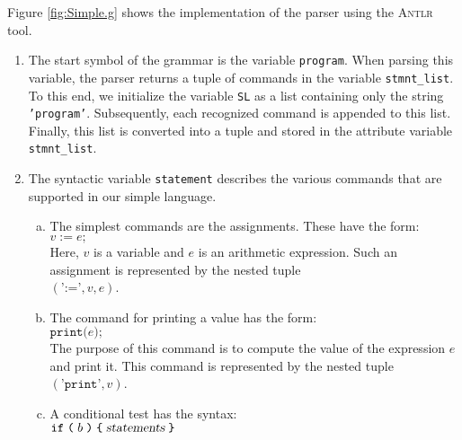\noindent
Figure \ref{fig:Simple.g} shows the implementation of the parser using the
\textsc{Antlr} tool.
\begin{enumerate}
\item The start symbol of the grammar is the variable \texttt{program}.
      When parsing this variable, the parser returns a tuple of commands in the variable
      \texttt{stmnt\_list}.
      To this end, we initialize the variable \texttt{SL}
      as a list containing only the string \texttt{'program'}. Subsequently, each recognized command
      is appended to this list. Finally, this list is converted into a tuple and stored in the
      attribute variable \texttt{stmnt\_list}.
\item The syntactic variable \texttt{statement} describes the various commands that 
      are supported in our simple language.
      \begin{enumerate}[(a)]
      \item The simplest commands are the assignments. These have the form:
            \\[0.2cm]
            \hspace*{1.3cm}
            $v \;\texttt{:=}\; e \texttt{;}$
            \\[0.2cm]
            Here, $v$ is a variable and $e$ is an arithmetic expression.
            Such an assignment is represented by the nested tuple
            \\[0.2cm]
            \hspace*{1.3cm}
            $(\texttt{':='}, v, e)$.
      \item The command for printing a value has the form:
            \\[0.2cm]
            \hspace*{1.3cm}
            $\texttt{print(} e \texttt{);}$
            \\[0.2cm]
            The purpose of this command is to compute the value of the expression $e$ and print it.
            This command is represented by the nested tuple
            \\[0.2cm]
            \hspace*{1.3cm}
            $(\texttt{'print'}, v)$.
      \item A conditional test has the syntax:
            \\[0.2cm]
            \hspace*{1.3cm}
            $\texttt{if}\; \texttt{(}\; b\; \texttt{)}\; \texttt{\{}\; \textsl{statements}\; \texttt{\}}$
            \\[0.2cm]

\end{enumerate}
\end{enumerate}

